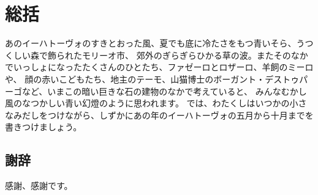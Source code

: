 \chapter{総括}
 あのイーハトーヴォのすきとおった風、夏でも底に冷たさをもつ青いそら、うつくしい森で飾られたモリーオ市、
 郊外のぎらぎらひかる草の波。またそのなかでいっしょになったたくさんのひとたち、ファゼーロとロザーロ、羊飼のミーロや、
 顔の赤いこどもたち、地主のテーモ、山猫博士のボーガント・デストゥパーゴなど、いまこの暗い巨きな石の建物のなかで考えていると、
 みんなむかし風のなつかしい青い幻燈のように思われます。
 では、わたくしはいつかの小さなみだしをつけながら、しずかにあの年のイーハトーヴォの五月から十月までを書きつけましょう。

\newpage

\section*{\Large 謝辞}
感謝、感謝です。